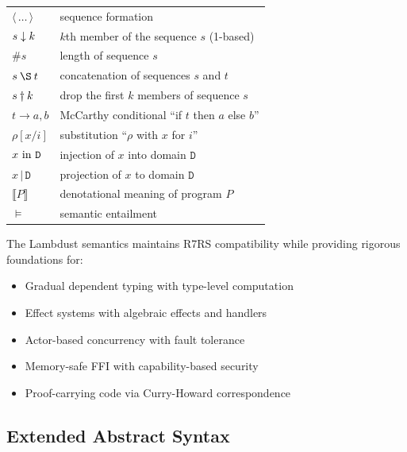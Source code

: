 \begin{tabular}{ll}
$\langle\,\ldots\,\rangle$ & sequence formation \\
$s \downarrow k$                 & $k$th member of the sequence $s$ (1-based) \\
$\#s$                      & length of sequence $s$ \\
$s \:\S\: t$               & concatenation of sequences $s$ and $t$ \\
$s \dagger k$                & drop the first $k$ members of sequence $s$ \\
$t \rightarrow a, b$       & McCarthy conditional ``if $t$ then $a$ else $b$'' \\
$\rho[x/i]$                & substitution ``$\rho$ with $x$ for $i$'' \\
$x\hbox{ \rm in }{\texttt{D}}$         & injection of $x$ into domain $\texttt{D}$ \\
$x\,\vert\,\texttt{D}$       & projection of $x$ to domain $\texttt{D}$ \\
$\llbracket P \rrbracket$  & denotational meaning of program $P$ \\
$\models$                  & semantic entailment
\end{tabular}

The Lambdust semantics maintains R7RS compatibility while providing rigorous foundations for:
\begin{itemize}
\item Gradual dependent typing with type-level computation
\item Effect systems with algebraic effects and handlers  
\item Actor-based concurrency with fault tolerance
\item Memory-safe FFI with capability-based security
\item Proof-carrying code via Curry-Howard correspondence
\end{itemize}

\subsection{Extended Abstract Syntax}

\def\K{\hbox{\rm K}}
\def\I{\hbox{\rm I}}
\def\E{\hbox{\rm E}}
\def\T{\hbox{\rm T}}
\def\F{\hbox{\rm F}}
\def\C{\hbox{$\Gamma$}}
\def\Con{\hbox{\rm Con}}
\def\Ide{\hbox{\rm Ide}}
\def\Typ{\hbox{\rm Typ}}
\def\Eff{\hbox{\rm Eff}}
\def\Exp{\hbox{\rm Exp}}
\def\Com{\hbox{\rm Com}}
\def\Prf{\hbox{\rm Prf}}
\def\|{$\vert$}

